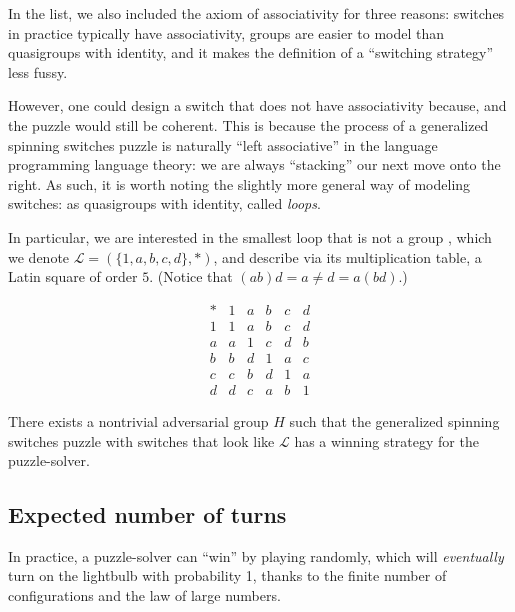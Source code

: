 In the list, we also included the axiom of associativity for three reasons:
switches in practice typically have associativity,
groups are easier to model than quasigroups with identity, and
it makes the definition of a ``switching strategy'' less fussy.

However, one could design a switch that does not have associativity
because, and the puzzle would still be coherent. This is because the process of
a generalized spinning switches puzzle is naturally
``left associative'' in the language programming language theory:
we are always ``stacking'' our next move onto the right.
As such, it is worth noting the slightly more general way of modeling switches:
as quasigroups with identity, called \textit{loops}.

In particular, we are interested in the smallest loop that is not a group
\cite{MSELoop}, which we denote
$\mathcal{L} = (\{1, a, b, c, d\}, \ast)$,
and describe via its multiplication table, a Latin square of order $5$.
(Notice that $(ab)d = a \neq d = a(bd)$.)
\begin{singlespace}
\begin{equation}
  \begin{array}{c|ccccc}
    \ast & 1 & a & b & c & d \\
    \hline
      1 & 1 & a & b & c & d \\
      a & a & 1 & c & d & b \\
      b & b & d & 1 & a & c \\
      c & c & b & d & 1 & a \\
      d & d & c & a & b & 1
  \end{array}
\end{equation}
\end{singlespace}

\begin{conjecture}
  There exists a nontrivial adversarial group $H$ such that the generalized
  spinning switches puzzle with switches that look like $\mathcal{L}$ has
  a winning strategy for the puzzle-solver.
\end{conjecture}

\subsection{Expected number of turns}
In practice, a puzzle-solver can ``win'' by playing randomly,
which will \textit{eventually} turn on the lightbulb with probability 1,
thanks to the finite number of configurations and the law of large numbers.

